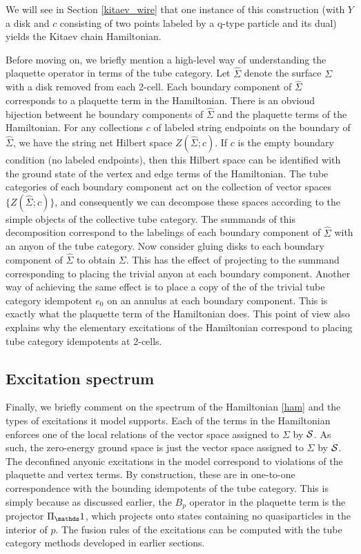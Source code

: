 We will see in Section \ref{kitaev_wire} that one instance of this construction (with $Y$ a disk and $c$ consisting of two points labeled by a q-type particle
and its dual) yields the Kitaev chain Hamiltonian.


\medskip


Before moving on, we briefly mention a 
high-level way of understanding the plaquette operator in terms of the tube category.
Let $\widehat\Sigma$ denote the surface $\Sigma$ with a disk removed from each 2-cell.
Each boundary component of $\widehat\Sigma$ corresponds to a plaquette term in the Hamiltonian. 
There is an obvioud bijection betweent he boundary components of $\widehat\Sigma$ and the plaquette terms of the Hamiltonian.
For any collections $c$ of labeled string endpoints on the boundary of $\widehat\Sigma$, we have
the string net Hilbert space $Z(\widehat\Sigma; c)$.
If $c$ is the empty boundary condition (no labeled endpoints), then this Hilbert space can be identified with
the ground state of the vertex and edge terms of the Hamiltonian.
The tube categories of each boundary component act on the collection of vector spaces $\{Z(\widehat\Sigma; c)\}$,
and consequently we can decompose these spaces according to the simple objects of the collective tube category.
The summands of this decomposition correspond to the labelings of each boundary component of $\widehat\Sigma$ with an
anyon of the tube category.
Now consider gluing disks to each boundary component of $\widehat\Sigma$ to obtain $\Sigma$.
This has the effect of projecting to the summand corresponding to placing the trivial anyon at each boundary component.
Another way of achieving the same effect is to place a copy of the of the trivial tube category idempotent $e_0$
on an annulus at each boundary component.
This is exactly what the plaquette term of the Hamiltonian does.
This point of view also explains why the elementary excitations of the Hamiltonian
correspond to placing tube category idempotents at 2-cells.






\subsection{Excitation spectrum} \label{excitations_of_H}

Finally, we briefly comment on the spectrum of the Hamiltonian \eqref{ham} and the types of excitations it model supports. 
Each of the terms in the Hamiltonian enforces one of the local relations of the vector space assigned to $\Sigma$ by $\mathcal{S}$. 
As such, the zero-energy ground space is just the vector space assigned to $\Sigma$ by $\mathcal{S}$.
The deconfined anyonic excitations in the model correspond to violations of the plaquette and vertex terms.
By construction, these are in one-to-one correspondence with the bounding idempotents of the tube category.
This is simply because as discussed earlier, the $B_p$ operator in the plaquette term is the projector $\Pi_\unit$, which projects onto states containing no quasiparticles in the interior of $p$. 
The fusion rules of the excitations can be computed with the tube category methods developed in earlier sections. 

